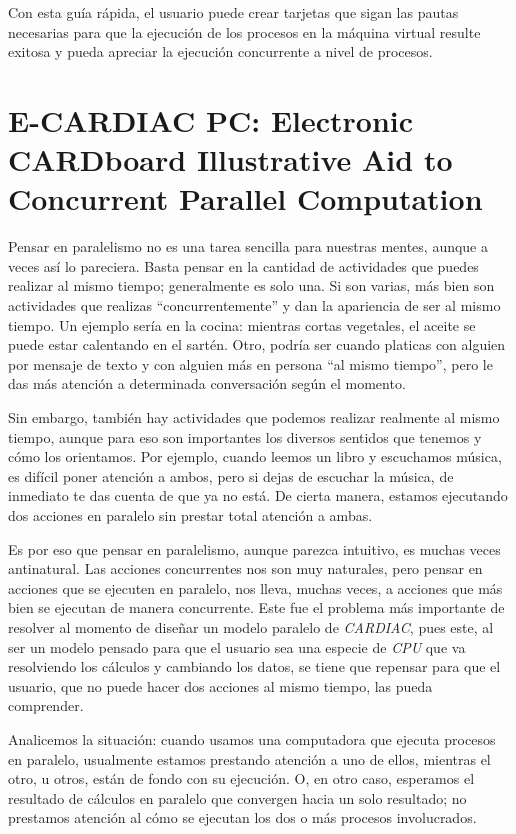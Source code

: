 \documentclass[letterpaper,12pt,oneside]{book}
\begin{document}
			
			Con esta guía rápida, el usuario puede crear tarjetas que sigan las pautas necesarias para que la ejecución de los procesos en
			la máquina virtual resulte exitosa y pueda apreciar la ejecución concurrente a nivel de procesos.
	
	\clearpage
	 \section{E-CARDIAC PC: Electronic CARDboard Illustrative Aid to Concurrent Parallel Computation}
	 
	 Pensar en paralelismo no es una tarea sencilla para nuestras mentes, aunque a veces así lo pareciera. Basta pensar en la cantidad de actividades
	 que puedes realizar al mismo tiempo; generalmente es solo una. Si son varias, más bien son actividades que realizas ``concurrentemente'' y
	 dan la apariencia de ser al mismo tiempo. Un ejemplo sería en la cocina: mientras cortas vegetales, el aceite se puede estar calentando en el 
	 sartén. Otro, podría ser 
	 cuando platicas con alguien por mensaje de texto
	 y con alguien más en persona ``al mismo tiempo'', pero le das más atención a determinada conversación según el momento. 
	 
	 Sin embargo, 
	 también
	 hay actividades que podemos realizar realmente al mismo tiempo, aunque para eso son importantes los diversos sentidos que tenemos y cómo los 
	 orientamos. Por
	 ejemplo, cuando leemos un libro y escuchamos música, es difícil poner atención a ambos, pero si dejas de escuchar 
	 la música,
	 de inmediato te das cuenta de que ya no está. De cierta manera, estamos ejecutando dos acciones en paralelo sin prestar total atención a ambas.
	 
	 Es por eso que pensar en paralelismo, aunque parezca intuitivo, es muchas veces antinatural. Las acciones concurrentes nos son muy naturales,
	 pero pensar en acciones que se ejecuten en paralelo, nos lleva, muchas veces, a acciones que más bien se ejecutan 
	 de manera concurrente. Este fue el problema
	 más importante de resolver al momento de diseñar un modelo paralelo de \textit{CARDIAC},
	  pues este, al ser un modelo pensado para que el usuario sea
	 una especie de \textit{CPU} que va resolviendo los cálculos y cambiando los datos, se tiene que repensar para que el usuario, que no puede hacer dos 
	 acciones al
	 mismo tiempo, las pueda comprender.
	 
	 Analicemos la situación: cuando usamos una computadora que ejecuta procesos en paralelo, 
	 usualmente estamos prestando
	 atención a uno de ellos, mientras el otro, u otros, están de fondo con su ejecución. O, en otro caso, 
	 esperamos el resultado
	 de cálculos en paralelo que convergen hacia un solo resultado; no prestamos atención al cómo se ejecutan los dos o más procesos involucrados.
	 
\end{document}
